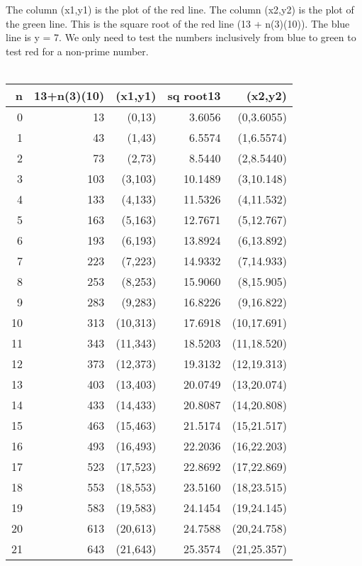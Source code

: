 \documentclass[12pt,letterpaper,oneside,titlepage]{article}
\begin{document}
\par
\tab The column (x1,y1) is the plot of the red line. The column (x2,y2) is the plot of the green line. This is the square root of the red line (13 + n(3)(10)). The blue line is y = 7. We only need to test the numbers inclusively from blue to green to test red for a non-prime number.  
\\
\\
\begin{tabular}{|r|r|r|r|r|}
\hline   n     & 13+n(3)(10)  &  (x1,y1)      &   sq root13  &  (x2,y2)      \\
\hline   0     & 13           &  (0,13)       &   3.6056     &  (0,3.6055)   \\
\hline   1     & 43           &  (1,43)       &   6.5574     &  (1,6.5574)   \\
\hline   2     & 73           &  (2,73)       &   8.5440     &  (2,8.5440)   \\
\hline   3     & 103          &  (3,103)      &   10.1489    &  (3,10.148)   \\
\hline   4     & 133          &  (4,133)      &   11.5326    &  (4,11.532)   \\
\hline   5     & 163          &  (5,163)      &   12.7671    &  (5,12.767)   \\
\hline   6     & 193          &  (6,193)      &   13.8924    &  (6,13.892)   \\
\hline   7     & 223          &  (7,223)      &   14.9332    &  (7,14.933)   \\
\hline   8     & 253          &  (8,253)      &   15.9060    &  (8,15.905)   \\
\hline   9     & 283          &  (9,283)      &   16.8226    &  (9,16.822)   \\
\hline   10    & 313          &  (10,313)     &   17.6918    &  (10,17.691)  \\
\hline   11    & 343          &  (11,343)     &   18.5203    &  (11,18.520)  \\
\hline   12    & 373          &  (12,373)     &   19.3132    &  (12,19.313)  \\
\hline   13    & 403          &  (13,403)     &   20.0749    &  (13,20.074)  \\
\hline   14    & 433          &  (14,433)     &   20.8087    &  (14,20.808)  \\
\hline   15    & 463          &  (15,463)     &   21.5174    &  (15,21.517)  \\
\hline   16    & 493          &  (16,493)     &   22.2036    &  (16,22.203)  \\
\hline   17    & 523          &  (17,523)     &   22.8692    &  (17,22.869)  \\
\hline   18    & 553          &  (18,553)     &   23.5160    &  (18,23.515)  \\
\hline   19    & 583          &  (19,583)     &   24.1454    &  (19,24.145)  \\
\hline   20    & 613          &  (20,613)     &   24.7588    &  (20,24.758)  \\
\hline   21    & 643          &  (21,643)     &   25.3574    &  (21,25.357)  \\
\hline 
\end{tabular} 
\end{document}
